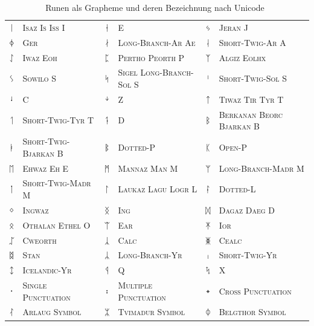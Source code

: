 \documentclass[a4paper]{scrartcl}
\begin{document}
\begin{table}[p]
\begin{center}
\begin{tabular}{clclcl}
      {\runicfont ᛁ} & \textsc{Isaz Is Iss I} &
      {\runicfont ᛂ} & \textsc{E} &
      {\runicfont ᛃ} & \textsc{Jeran J} \\
      {\runicfont ᛄ} & \textsc{Ger} &
      {\runicfont ᛅ} & \textsc{Long-Branch-Ar Ae} &
      {\runicfont ᛆ} & \textsc{Short-Twig-Ar A} \\
      {\runicfont ᛇ} & \textsc{Iwaz Eoh} &
      {\runicfont ᛈ} & \textsc{Pertho Peorth P} &
      {\runicfont ᛉ} & \textsc{Algiz Eolhx} \\
      {\runicfont ᛊ} & \textsc{Sowilo S} &
      {\runicfont ᛋ} & \textsc{Sigel Long-Branch-Sol S} &
      {\runicfont ᛌ} & \textsc{Short-Twig-Sol S} \\
      {\runicfont ᛍ} & \textsc{C} &
      {\runicfont ᛎ} & \textsc{Z} &
      {\runicfont ᛏ} & \textsc{Tiwaz Tir Tyr T} \\
      {\runicfont ᛐ} & \textsc{Short-Twig-Tyr T} &
      {\runicfont ᛑ} & \textsc{D} &
      {\runicfont ᛒ} & \textsc{Berkanan Beorc Bjarkan B} \\
      {\runicfont ᛓ} & \textsc{Short-Twig-Bjarkan B} &
      {\runicfont ᛔ} & \textsc{Dotted-P} &
      {\runicfont ᛕ} & \textsc{Open-P} \\
      {\runicfont ᛖ} & \textsc{Ehwaz Eh E} &
      {\runicfont ᛗ} & \textsc{Mannaz Man M} &
      {\runicfont ᛘ} & \textsc{Long-Branch-Madr M} \\
      {\runicfont ᛙ} & \textsc{Short-Twig-Madr M} &
      {\runicfont ᛚ} & \textsc{Laukaz Lagu Logr L} &
      {\runicfont ᛛ} & \textsc{Dotted-L} \\
      {\runicfont ᛜ} & \textsc{Ingwaz} &
      {\runicfont ᛝ} & \textsc{Ing} &
      {\runicfont ᛞ} & \textsc{Dagaz Daeg D} \\
      {\runicfont ᛟ} & \textsc{Othalan Ethel O} &
      {\runicfont ᛠ} & \textsc{Ear} &
      {\runicfont ᛡ} & \textsc{Ior} \\
      {\runicfont ᛢ} & \textsc{Cweorth} &
      {\runicfont ᛣ} & \textsc{Calc} &
      {\runicfont ᛤ} & \textsc{Cealc} \\
      {\runicfont ᛥ} & \textsc{Stan} &
      {\runicfont ᛦ} & \textsc{Long-Branch-Yr} &
      {\runicfont ᛧ} & \textsc{Short-Twig-Yr} \\
      {\runicfont ᛨ} & \textsc{Icelandic-Yr} &
      {\runicfont ᛩ} & \textsc{Q} &
      {\runicfont ᛪ} & \textsc{X} \\
      {\runicfont ᛫} & \textsc{Single Punctuation} &
      {\runicfont ᛬} & \textsc{Multiple Punctuation} &
      {\runicfont ᛭} & \textsc{Cross Punctuation} \\
      {\runicfont ᛮ} & \textsc{Arlaug Symbol} &
      {\runicfont ᛯ} & \textsc{Tvimadur Symbol} &
      {\runicfont ᛰ} & \textsc{Belgthor Symbol}
    \end{tabular}
    \caption{Runen als Grapheme und deren Bezeichnung nach Unicode~\cite{runic-unicode}}
  \end{center}
\end{table}
\end{document}
